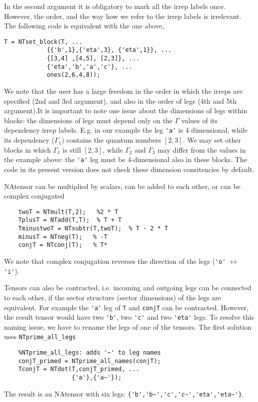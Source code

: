 \documentclass[aps,prb,twocolumn,showpacs,preprintnumbers,amsmath,amssymb, superscriptaddressm, nofootinbib]{revtex4-2}   %
\begin{document}
In the second argument it is obligatory to mark all the irrep labels once. However, the order, and the way how we refer to the irrep labels is irrelevant. The following code is equivalent with the one above,
\begin{verbatim}
T = NTset_block(T, ...
            {{'b',1},{'eta',3}, {'eta',1}}, ...
            {[3,4] ,[4,5], [2,3]}, ...
            {'eta','b','a','c'}, ...
            ones(2,6,4,8)); 
\end{verbatim}
We note that the user has a large freedom in the order in which the irreps are specified (2nd and 3rd argument), and also in the order of legs (4th and 5th argument).It is important to note one issue about the dimensions of legs within blocks: the dimensions of legs must depend only on the $\Gamma$ values of its dependency irrep labels. E.g. in our example the leg \verb|'a'| is 4 dimensional, while its dependency ($\Gamma_1$) contains the quantum numbers $[2,3]$. We may set other blocks in which $\Gamma_1$ is still $[2,3]$, while $\Gamma_2$ and $\Gamma_3$ may differ from the values in the example above: the \verb|'a'| leg must be $4$-dimensional also in these blocks. The code in its present version does not check these dimension consitencies by default.

NAtensor can be multiplied by scalars, can be added to each other, or can be complex conjugated
\begin{verbatim}
    twoT = NTmult(T,2);   %2 * T 
    TplusT = NTadd(T,T);  % T + T
    TminustwoT = NTsubtr(T,twoT);  % T - 2 * T
    minusT = NTneg(T);   % -T
    conjT = NTconj(T);   % T*
\end{verbatim}
We note that complex conjugation reverses the direction of the legs (\verb|'o'| $\leftrightarrow$ \verb|'i'|).

Tensors can also be contracted, i.e. incoming and outgoing legs can be connected to each other, if the sector structure (sector dimensions) of the legs are equivalent. For example the \verb|'a'| leg of \verb|T| and \verb|conjT| can be contracted. However, the result tensor would have two \verb|'b'|, two \verb|'c'| and two \verb|'eta'| legs. To resolve this naming issue, we have to rename the legs of one of the tensors. The first solution uses \verb|NTprime_all_legs|
\begin{verbatim}
    %NTprime_all_legs: adds '~' to leg names
    conjT_primed = NTprime_all_names(conjT);
    TconjT = NTdot(T,conjT_primed, ... 
                   {'a'},{'a~'});
\end{verbatim}
The result is an NAtensor with six legs: \verb|{'b','b~','c','c~','eta','eta~'}|. 
\end{document}
